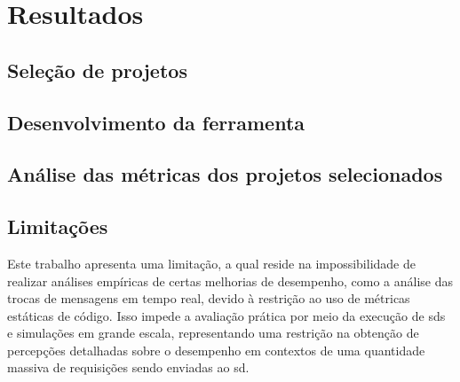 \chapter{Resultados}
\label{chapter:results}

\section{Seleção de projetos}


\section{Desenvolvimento da ferramenta}


\section{Análise das métricas dos projetos selecionados}


\section{Limitações}
\label{sec:limitacoes}
Este trabalho apresenta uma limitação, a qual reside na impossibilidade de realizar análises empíricas de certas melhorias de desempenho, como a análise das trocas de mensagens em tempo real, devido à restrição ao uso de métricas estáticas de código. Isso impede a avaliação prática por meio da execução de \gls{sds} e simulações em grande escala, representando uma restrição na obtenção de percepções detalhadas sobre o desempenho em contextos de uma quantidade massiva de requisições sendo enviadas ao \gls{sd}.
